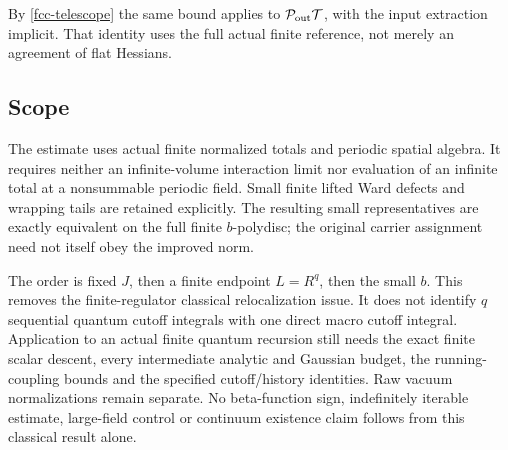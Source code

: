 By \eqref{fcc-telescope} the same bound applies to
\(\mathcal P_{\rm out}\mathcal T\), with the input
extraction implicit. That identity uses the full
actual finite reference, not merely an agreement
of flat Hessians.

\subsection{Scope}
\label{fcc-scope}

The estimate uses actual finite normalized totals
and periodic spatial algebra. It requires neither
an infinite-volume interaction limit nor evaluation
of an infinite total at a nonsummable periodic
field. Small finite lifted Ward defects and
wrapping tails are retained explicitly. The
resulting small representatives are exactly
equivalent on the full finite \(b\)-polydisc; the
original carrier assignment need not itself
obey the improved norm.

The order is fixed \(J\), then a finite endpoint
\(L=R^q\), then the small \(b\). This removes the
finite-regulator classical relocalization issue.
It does not identify \(q\) sequential quantum
cutoff integrals with one direct macro cutoff
integral. Application to an actual finite quantum
recursion still needs the exact finite scalar
descent, every intermediate analytic and Gaussian
budget, the running-coupling bounds and the
specified cutoff/history identities. Raw vacuum
normalizations remain separate. No beta-function
sign, indefinitely iterable estimate, large-field
control or continuum existence claim follows
from this classical result alone.
